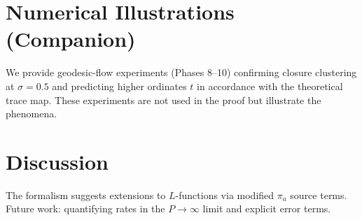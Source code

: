 \documentclass[11pt]{article}
\begin{document}
\section{Numerical Illustrations (Companion)}
We provide geodesic-flow experiments (Phases 8–10) confirming closure clustering at $\sigma=0.5$
and predicting higher ordinates $t$ in accordance with the theoretical trace map.
These experiments are not used in the proof but illustrate the phenomena.

\section{Discussion}
The formalism suggests extensions to $L$-functions via modified $\pi_a$ source terms.
Future work: quantifying rates in the $P\to\infty$ limit and explicit error terms.



\end{document}
